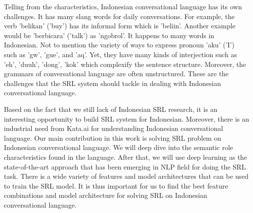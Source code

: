 Telling from the characteristics, Indonesian conversational language has its own challenges. It has many slang words for daily conversations. For example, the verb 'belikan' ('buy') has its informal form which is 'beliin'. Another example would be 'berbicara' ('talk') as 'ngobrol'. It happens to many words in Indonesian. Not to mention the variety of ways to express pronoun 'aku' ('I') such as 'gw', 'gue', and 'aq'. Yet, they have many kinds of interjection such as 'eh', 'duuh', 'dong', 'kok' which complexify the sentence structure. Moreover, the grammars of conversational language are often unstructured. These are the challenges that the SRL system should tackle in dealing with Indonesian conversational language.

Based on the fact that we still lack of Indonesian SRL research, it is an interesting opportunity to build SRL system for Indonesian. Moreover, there is an industrial need from Kata.ai for understanding Indonesian conversational language. Our main contribution in this work is solving SRL problem on Indonesian conversational language. We will deep dive into the semantic role characteristics found in the language. After that, we will use deep learning as the state-of-the-art approach that has been emerging in NLP field for doing the SRL task. There is a wide variety of features and model architectures that can be used to train the SRL model. It is thus important for us to find the best feature combinations and model architecture for solving SRL on Indonesian conversational language.


